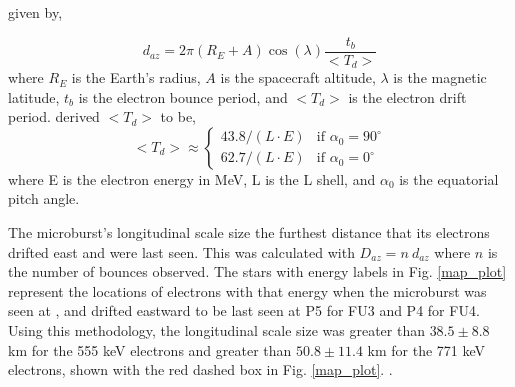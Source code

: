 \documentclass[draft, linenumbers]{agujournal}
\begin{document}
 given by, 

\begin{equation}
d_{az} = 2 \pi (R_E + A) \cos(\lambda) \frac{t_b}{<T_{d}>}
\label{bounce_drift}
\end{equation} where $R_E$ is the Earth's radius, $A$ is the spacecraft altitude, $\lambda$ is the magnetic latitude, $t_b$ is the electron bounce period, and $<T_{d}>$ is the electron drift period. \citet{Parks2003} derived $<T_{d}>$ to be,
\begin{equation}
<T_{d}> \approx
\begin{cases}
43.8 /(L \cdot E) & \text{if } \alpha_0 = 90^{\circ} \\    62.7/(L \cdot E) & \text{if } \alpha_0 = 0^{\circ}
\end{cases}
\label{drift}
\end{equation} where E is the electron energy in MeV, L is the L shell, and $\alpha_0$ is the equatorial pitch angle. 

The microburst's longitudinal scale size  the furthest distance that its electrons drifted east and were last seen. This was calculated with $D_{az} = n \ d_{az}$ where $n$ is the number of bounces observed. The stars with energy labels in Fig. \ref{map_plot} represent the locations of electrons with that energy when the microburst was seen at , and drifted eastward to be last seen at P5 for FU3 and P4 for FU4. Using this methodology, the longitudinal scale size was greater than $ 38.5 \pm 8.8$ km for the 555 keV electrons and greater than $ 50.8 \pm 11.4$ km for the 771 keV electrons, shown with the red dashed box in Fig. \ref{map_plot}. .
\end{document}
